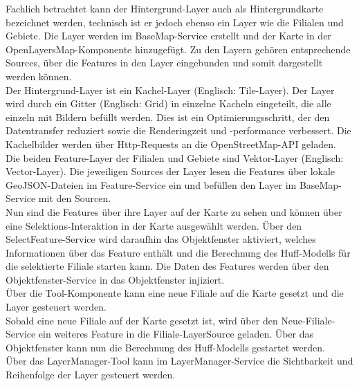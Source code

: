 Fachlich betrachtet kann der Hintergrund-Layer auch als Hintergrundkarte bezeichnet werden, technisch ist er jedoch ebenso ein Layer wie die Filialen und Gebiete. 
Die Layer werden im BaseMap-Service erstellt und der Karte in der OpenLayersMap-Komponente hinzugefügt.
Zu den Layern gehören entsprechende Sources, über die Features in den Layer eingebunden und somit dargestellt werden können.\\
Der Hintergrund-Layer ist ein Kachel-Layer (Englisch: Tile-Layer).
Der Layer wird durch ein Gitter (Englisch: Grid) in einzelne Kacheln eingeteilt, die alle einzeln mit Bildern befüllt werden.
Dies ist ein Optimierungsschritt, der den Datentransfer reduziert sowie die Renderingzeit und -performance verbessert.
Die Kachelbilder werden über Http-Requests an die OpenStreetMap-API geladen.\\
Die beiden Feature-Layer der Filialen und Gebiete sind Vektor-Layer (Englisch: Vector-Layer).
Die jeweiligen Sources der Layer lesen die Features über lokale GeoJSON-Dateien im Feature-Service ein und befüllen den Layer im BaseMap-Service mit den Sourcen.\\
Nun sind die Features über ihre Layer auf der Karte zu sehen und können über eine Selektions-Interaktion in der Karte ausgewählt werden.
Über den SelectFeature-Service wird daraufhin das Objektfenster aktiviert, welches Informationen über das Feature enthält und die Berechnung des Huff-Modells für die selektierte Filiale starten kann.
Die Daten des Features werden über den Objektfenster-Service in das Objektfenster injiziert.\\
Über die Tool-Komponente kann eine neue Filiale auf die Karte gesetzt und die Layer gesteuert werden.\\
Sobald eine neue Filiale auf der Karte gesetzt ist, wird über den Neue-Filiale-Service ein weiteres Feature in die Filiale-LayerSource geladen. 
Über das Objektfenster kann nun die Berechnung des Huff-Modells gestartet werden.\\
Über das LayerManager-Tool kann im LayerManager-Service die Sichtbarkeit und Reihenfolge der Layer gesteuert werden.
